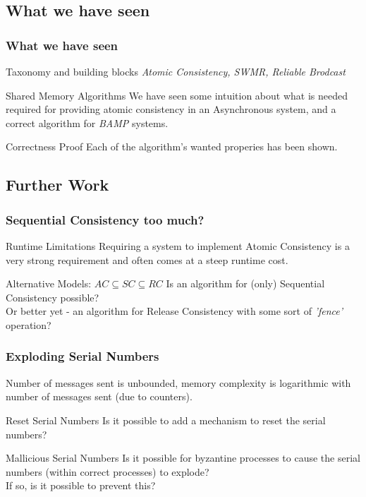 \subsection{What we have seen}
\begin{frame}
    \frametitle{What we have seen}
    \begin{block}{Taxonomy and building blocks}
        \emph{Atomic Consistency, SWMR, Reliable Brodcast}
    \end{block}
    \begin{block}{Shared Memory Algorithms}
        We have seen some intuition
        about what is needed required for providing atomic consistency
        in an Asynchronous system, and a correct algorithm for \emph{BAMP} systems.
    \end{block}
    \begin{block}{Correctness Proof}
        Each of the algorithm's wanted properies has been shown.
    \end{block}
\end{frame}

\subsection{Further Work}
\begin{frame}
    \frametitle{Sequential Consistency too much?}
    \begin{alertblock}{Runtime Limitations}
        Requiring a system to implement Atomic Consistency is a very strong requirement
        and often comes at a steep runtime cost.
    \end{alertblock}
    \begin{block}{Alternative Models: $AC\subseteq SC\subseteq RC$}
        Is an algorithm for (only) Sequential Consistency possible?\\
        Or better yet - an algorithm for Release Consistency with some sort of
        \emph{'fence'} operation?
    \end{block}
\end{frame}

\begin{frame}
    \frametitle{Exploding Serial Numbers}
    Number of messages sent is unbounded, memory complexity
    is logarithmic with number of messages sent (due to counters).
    \begin{block}{Reset Serial Numbers}
        Is it possible to add a mechanism to reset the serial numbers?
    \end{block}
    \begin{block}{Mallicious Serial Numbers}
        Is it possible for byzantine processes to cause the serial numbers (within correct processes) to explode?\\
        If so, is it possible to prevent this?
    \end{block}
\end{frame}

